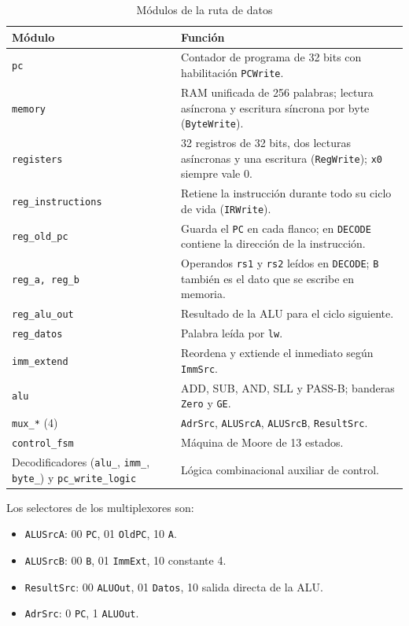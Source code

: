 \documentclass[conference]{IEEEtran}
\newcommand{\cod}[1]{\texttt{\small #1}}
\begin{document}
\begin{table}[t]
\caption{Módulos de la ruta de datos}\label{tab:mod}
\centering\footnotesize
\setlength{\tabcolsep}{3pt}\begin{tabular}{@{}p{2.9cm}p{5.4cm}@{}}\toprule
Módulo & Función\\\midrule
\cod{pc} & Contador de programa de 32 bits con habilitación \cod{PCWrite}.\\
\cod{memory} & RAM unificada de 256 palabras; lectura asíncrona y escritura síncrona por byte (\cod{ByteWrite}).\\
\cod{registers} & 32 registros de 32 bits, dos lecturas asíncronas y una escritura (\cod{RegWrite}); \cod{x0} siempre vale 0.\\
\cod{reg\_instructions} & Retiene la instrucción durante todo su ciclo de vida (\cod{IRWrite}).\\
\cod{reg\_old\_pc} & Guarda el \cod{PC} en cada flanco; en \cod{DECODE} contiene la dirección de la instrucción.\\
\cod{reg\_a, reg\_b} & Operandos \cod{rs1} y \cod{rs2} leídos en \cod{DECODE}; \cod{B} también es el dato que se escribe en memoria.\\
\cod{reg\_alu\_out} & Resultado de la ALU para el ciclo siguiente.\\
\cod{reg\_datos} & Palabra leída por \cod{lw}.\\
\cod{imm\_extend} & Reordena y extiende el inmediato según \cod{ImmSrc}.\\
\cod{alu} & ADD, SUB, AND, SLL y PASS-B; banderas \cod{Zero} y \cod{GE}.\\
\cod{mux\_*} (4) & \cod{AdrSrc}, \cod{ALUSrcA}, \cod{ALUSrcB}, \cod{ResultSrc}.\\
\cod{control\_fsm} & Máquina de Moore de 13 estados.\\
Decodificadores (\cod{alu\_}, \cod{imm\_}, \cod{byte\_}) y \cod{pc\_write\_logic} & Lógica combinacional auxiliar de control.\\\bottomrule
\end{tabular}
\end{table}

Los selectores de los multiplexores son:
\begin{itemize}
\item \cod{ALUSrcA}: 00 \cod{PC}, 01 \cod{OldPC}, 10 \cod{A}.
\item \cod{ALUSrcB}: 00 \cod{B}, 01 \cod{ImmExt}, 10 constante 4.
\item \cod{ResultSrc}: 00 \cod{ALUOut}, 01 \cod{Datos}, 10 salida directa de la ALU.
\item \cod{AdrSrc}: 0 \cod{PC}, 1 \cod{ALUOut}.
\end{itemize}
\end{document}

